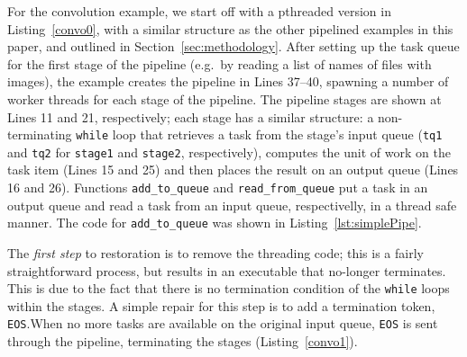\noindent
For the convolution example, we start off with a pthreaded version in Listing~\ref{convo0}, with a similar structure as the other pipelined examples in this paper, and outlined in Section~\ref{sec:methodology}. After setting up the task queue for the first stage of the pipeline (e.g.~by reading a list of names of files with images), the example creates the pipeline in Lines 37--40, spawning a number of worker threads for each stage of the pipeline. The pipeline stages are shown at Lines 11 and 21, respectively; each stage has a similar structure: a non-terminating \lstinline{while} loop that retrieves a task from the stage's input queue (\lstinline{tq1} and \lstinline{tq2} for \lstinline{stage1} and \lstinline{stage2}, respectively), computes the unit of work on the task item (Lines 15 and 25) and then places the result on an output queue (Lines 16 and 26). Functions \lstinline{add_to_queue} and \lstinline{read_from_queue} put a task in an output queue and read a task from an input queue, respectivelly, in a thread safe manner. The code for \lstinline{add_to_queue} was shown in Listing~\ref{lst:simplePipe}.

The \emph{first step} to restoration is to remove the threading code; this is a fairly straightforward process, but results in an executable that no-longer terminates. This is due to the fact that there is no termination condition of the \lstinline{while} loops within the stages. A simple repair for this step is to add a termination token, \lstinline{EOS}.When no more tasks are available on the original input queue, \lstinline{EOS} is sent through the pipeline, terminating the stages (Listing~\ref{convo1}).

